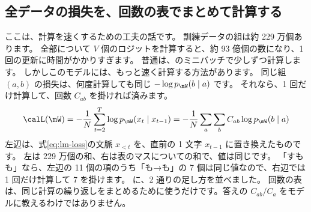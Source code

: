 \subsection*{全データの損失を、回数の表でまとめて計算する}

ここは、計算を速くするための工夫の話です。
訓練データの組は約 229 万個あります。
全部について $V$ 個のロジットを計算すると、約 93 億個の数になり、1 回の更新に時間がかかりすぎます。
普通は、のミニバッチで少しずつ計算します。
しかしこのモデルには、もっと速く計算する方法があります。
同じ組 $(a,b)$ の損失は、何度計算しても同じ $-\log p_{\mW}(b\mid a)$ です。
それなら、1 回だけ計算して、回数 $C_{ab}$ を掛ければ済みます。
\begin{equation}
\calL(\mW)=-\frac{1}{N}\sum_{t=2}^{T}\log p_{\mW}(x_t\mid x_{t-1})
=-\frac{1}{N}\sum_{a}\sum_{b}C_{ab}\log p_{\mW}(b\mid a)
\label{eq:lm-table-loss}
\end{equation}
左辺は、式\eqref{eq:lm-loss}の文脈 $x_{<t}$ を、直前の 1 文字 $x_{t-1}$ に置き換えたものです。
左は 229 万個の和、右は表のマスについての和で、値は同じです。
「すもも」なら、左辺の 11 個の項のうち「も→も」の 7 個は同じ値なので、右辺では 1 回だけ計算して 7 を掛けます。
に、2 通りの足し方を並べました。%
回数の表は、同じ計算の繰り返しをまとめるために使うだけです。答えの $C_{ab}/C_a$ をモデルに教えるわけではありません。


